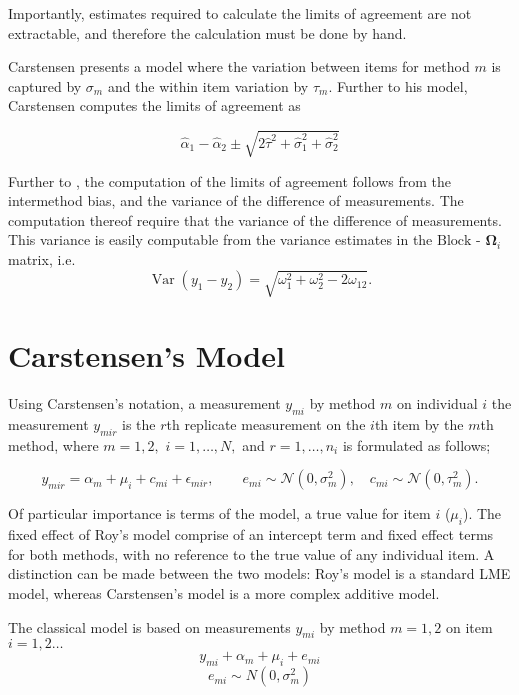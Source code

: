 \documentclass[12pt, a4paper]{report}
\theoremstyle{plain}
\theoremstyle{definition}
\theoremstyle{remark}
\begin{document}
	Importantly, estimates required to calculate the limits of agreement are not extractable, and therefore the calculation must be done by hand.
	
	
	Carstensen presents a model where the variation between items for
	method $m$ is captured by $\sigma_m$ and the within item variation
	by $\tau_m$. 	Further to his model, Carstensen computes the limits of agreement
	as
	
	\[
	\hat{\alpha}_1 - \hat{\alpha}_2 \pm \sqrt{2 \hat{\tau}^2 +
		\hat{\sigma}^2_1 + \hat{\sigma}^2_2}
	\]
	
	Further to \citet{BA86}, the computation of the limits of agreement follows from the intermethod bias, and the variance of the difference of measurements. 	The computation thereof require that the variance of the difference of measurements. This variance is easily computable from the  variance estimates in the ${\mbox{Block - }\boldsymbol \Omega_{i}}$ matrix, i.e.
	\[
	\operatorname{Var}(y_1 - y_2) = \sqrt{ \omega^2_1 + \omega^2_2 - 2\omega_{12}}.
	\]
\section{Carstensen's Model}


Using Carstensen's notation, a measurement $y_{mi}$ by method $m$ on individual $i$ the measurement $y_{mir} $ is the $r$th replicate measurement on the $i$th item by the $m$th method, where $m=1,2,$ $i=1,\ldots,N,$ and $r = 1,\ldots,n_i$ is formulated as follows;

\begin{equation}
y_{mir}  = \alpha_{m} + \mu_{i} + c_{mi} + \epsilon_{mir}, \qquad  e_{mi}
\sim \mathcal{N}(0,\sigma^{2}_{m}), \quad c_{mi} \sim \mathcal{N}(0,\tau^{2}_{m}).
\end{equation}

Of particular importance is terms of the model, a true value for item $i$ ($\mu_{i}$).  The fixed effect of Roy's model comprise of an intercept term and fixed effect terms for both methods, with no reference to the true value of any individual item. A distinction can be made between the two models: Roy's model is a standard LME model, whereas Carstensen's model is a more complex additive model.

The classical model is based on measurements $y_{mi}$
by method $m=1,2$ on item $i = 1,2 \ldots$
\[y_{mi} + \alpha_{m} + \mu_{i} + e_{mi}\]
\[e_{mi} \sim N(0,\sigma^2_m)\]
\end{document}

